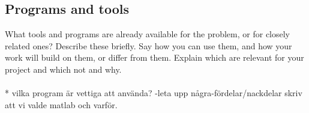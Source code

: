 \subsection{Programs and tools}
What tools and programs are already available for the problem, or for closely related ones?
Describe these briefly. Say how you can use them, and how your work will build on them, or differ from them. Explain which are relevant for your project and which not and why.
\\\\
* vilka program är vettiga att använda? -leta upp några-fördelar/nackdelar
skriv att vi valde matlab och varför.



